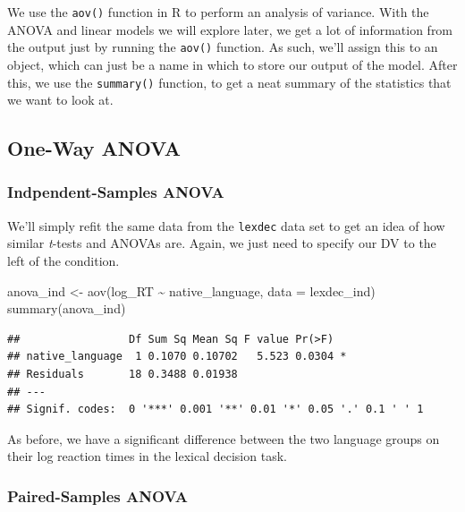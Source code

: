 \documentclass[
]{book}
\newenvironment{Shaded}{\begin{snugshade}}{\end{snugshade}}
\newcommand{\AttributeTok}[1]{\textcolor[rgb]{0.77,0.63,0.00}{#1}}
\newcommand{\FunctionTok}[1]{\textcolor[rgb]{0.00,0.00,0.00}{#1}}
\newcommand{\NormalTok}[1]{#1}
\newcommand{\OtherTok}[1]{\textcolor[rgb]{0.56,0.35,0.01}{#1}}
\newcommand{\SpecialCharTok}[1]{\textcolor[rgb]{0.00,0.00,0.00}{#1}}
\begin{document}
We use the \texttt{aov()} function in R to perform an analysis of variance. With the ANOVA and linear models we will explore later, we get a lot of information from the output just by running the \texttt{aov()} function. As such, we'll assign this to an object, which can just be a name in which to store our output of the model. After this, we use the \texttt{summary()} function, to get a neat summary of the statistics that we want to look at.

\hypertarget{one-way-anova}{%
\subsection{One-Way ANOVA}\label{one-way-anova}}

\hypertarget{indpendent-samples-anova}{%
\subsubsection{Indpendent-Samples ANOVA}\label{indpendent-samples-anova}}

We'll simply refit the same data from the \texttt{lexdec} data set to get an idea of how similar \emph{t}-tests and ANOVAs are. Again, we just need to specify our DV to the left of the condition.

\begin{Shaded}
\begin{Highlighting}[]
\NormalTok{anova\_ind }\OtherTok{\textless{}{-}} \FunctionTok{aov}\NormalTok{(log\_RT }\SpecialCharTok{\textasciitilde{}}\NormalTok{ native\_language, }\AttributeTok{data =}\NormalTok{ lexdec\_ind)}
\FunctionTok{summary}\NormalTok{(anova\_ind)}
\end{Highlighting}
\end{Shaded}

\begin{verbatim}
##                 Df Sum Sq Mean Sq F value Pr(>F)  
## native_language  1 0.1070 0.10702   5.523 0.0304 *
## Residuals       18 0.3488 0.01938                 
## ---
## Signif. codes:  0 '***' 0.001 '**' 0.01 '*' 0.05 '.' 0.1 ' ' 1
\end{verbatim}

As before, we have a significant difference between the two language groups on their log reaction times in the lexical decision task.

\hypertarget{paired-samples-anova}{%
\subsubsection{Paired-Samples ANOVA}\label{paired-samples-anova}}
\end{document}
